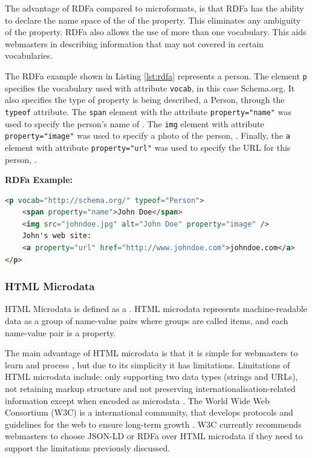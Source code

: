 The advantage of RDFa compared to microformats, is that RDFa has the ability to declare the name space of the of the property. This eliminates any ambiguity of the property. RDFa also allows the use of more than one vocabulary. This aids webmasters in describing information that may not covered in certain vocabularies. \newpage

The RDFa example shown in Listing \ref{lst:rdfa} represents a person. The element \texttt{p} specifies the vocabulary used with attribute \texttt{vocab}, in this case Schema.org. It also specifies the type of property is being described, a Person, through the \texttt{typeof} attribute. The \texttt{span} element with the attribute \texttt{property="name"} was used to specify the person's name of . The \texttt{img} element with attribute \texttt{property="image"} was used to specify a photo of the person, . Finally, the \texttt{a} element with attribute \texttt{property="url"} was used to specify the URL for this person, .\newline

\noindent
\textbf{RDFa Example:}
{
\begin{lstlisting}[language=HTML,caption={A RDFa Example},captionpos=b,label={lst:rdfa}]
<p vocab="http://schema.org/" typeof="Person">
    <span property="name">John Doe</span>
    <img src="johndoe.jpg" alt="John Doe" property="image" />
    John's web site: 
    <a property="url" href="http://www.johndoe.com">johndoe.com</a>
</p>
\end{lstlisting}
}

\subsubsection{HTML Microdata}
HTML Microdata is defined as a  \cite{htmlMicrodata2018}. HTML microdata represents machine-readable data as a group of name-value pairs \cite{sikos2015mastering} where groups are called items, and each name-value pair is a property. 

The main advantage of HTML microdata is that it is simple for webmasters to learn and process \cite{htmlMicrodata2018}, but due to its simplicity it has limitations. Limitations of HTML microdata include: only supporting two data types (strings and URLs), not retaining markup structure and not preserving internationalisation-related information except when encoded as microdata \cite{htmlMicrodata2018}. The World Wide Web Consortium (W3C) is a international community, that develops protocols and guidelines for the web to ensure long-term growth \cite{w3cFAQ}. W3C currently recommends webmasters to choose JSON-LD or RDFa over HTML microdata \cite{htmlMicrodata2018} if they need to support the limitations previously discussed. 

